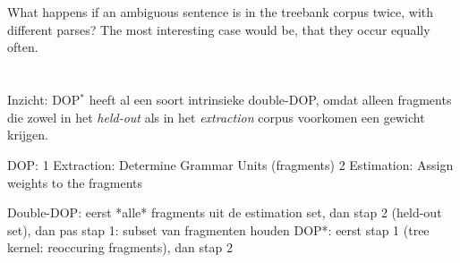 \documentclass{article}
\begin{document}
\section{}
What happens if an ambiguous sentence is in the treebank corpus twice, with different parses? The most interesting case would be, that they occur equally often.




\section{}
Inzicht: DOP$^*$ heeft al een soort intrinsieke double-DOP, omdat alleen fragments die zowel in het \emph{held-out} als in het \emph{extraction} corpus voorkomen een gewicht krijgen.







DOP:
1 Extraction: Determine Grammar Units (fragments)
2 Estimation: Assign weights to the fragments

Double-DOP: eerst *alle* fragments uit de estimation set, dan stap 2 (held-out set), dan pas stap 1: subset van fragmenten houden
DOP*: eerst stap 1 (tree kernel: reoccuring fragments), dan stap 2
\end{document}
